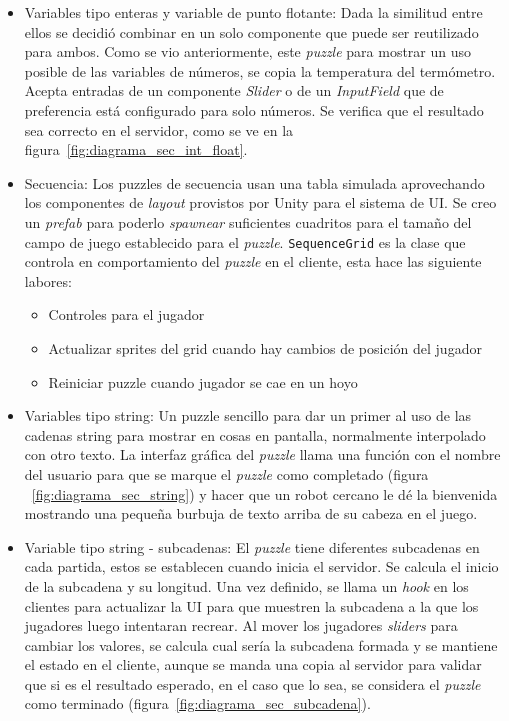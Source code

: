 \begin{itemize}
    \item Variables tipo enteras y variable de punto flotante: Dada la similitud entre ellos se decidió combinar en un solo componente que puede ser reutilizado para ambos. Como se vio anteriormente, este \textit{puzzle} para mostrar un uso posible de las variables de números, se copia la temperatura del termómetro. Acepta entradas de un componente \textit{Slider} o de un \textit{InputField} que de preferencia está configurado para solo números. Se verifica que el resultado sea correcto en el servidor, como se ve en la figura~\ref{fig:diagrama_sec_int_float}.
    \item Secuencia: Los puzzles de secuencia usan una tabla simulada aprovechando los componentes de \textit{layout} provistos por Unity para el sistema de UI. Se creo un \textit{prefab} para poderlo \textit{spawnear} suficientes cuadritos para el tamaño del campo de juego establecido para el \textit{puzzle}. \texttt{SequenceGrid} es la clase que controla en comportamiento del \textit{puzzle} en el cliente, esta hace las siguiente labores:
    \begin{itemize}
        \item Controles para el jugador
        \item Actualizar sprites del grid cuando hay cambios de posición del jugador
        \item Reiniciar puzzle cuando jugador se cae en un hoyo
    \end{itemize}
    \item Variables tipo string: Un puzzle sencillo para dar un primer al uso de las cadenas string para mostrar en cosas en pantalla, normalmente interpolado con otro texto. La interfaz gráfica del \textit{puzzle} llama una función con el nombre del usuario para que se marque el \textit{puzzle} como completado (figura ~\ref{fig:diagrama_sec_string}) y hacer que un robot cercano le dé la bienvenida mostrando una pequeña burbuja de texto arriba de su cabeza en el juego.
    \item Variable tipo string - subcadenas: El \textit{puzzle} tiene diferentes subcadenas en cada partida, estos se establecen cuando inicia el servidor. Se calcula el inicio de la subcadena y su longitud. Una vez definido, se llama un \textit{hook} en los clientes para actualizar la UI para que muestren la subcadena a la que los jugadores luego intentaran recrear. Al mover los jugadores \textit{sliders} para cambiar los valores, se calcula cual sería la subcadena formada y se mantiene el estado en el cliente, aunque se manda una copia al servidor para validar que si es el resultado esperado, en el caso que lo sea, se considera el \textit{puzzle} como terminado (figura~\ref{fig:diagrama_sec_subcadena}).

\end{itemize}
